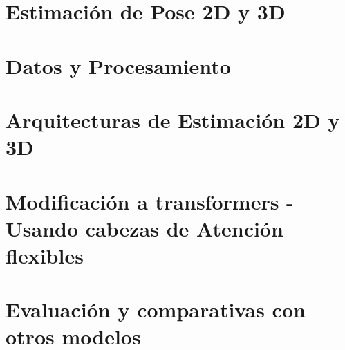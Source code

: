 \section{Estimación de Pose 2D y 3D}
\section{Datos y Procesamiento}
\section{Arquitecturas de Estimación 2D y 3D}
\section{Modificación a transformers - Usando cabezas de Atención flexibles}
\section{Evaluación y comparativas con otros modelos}

